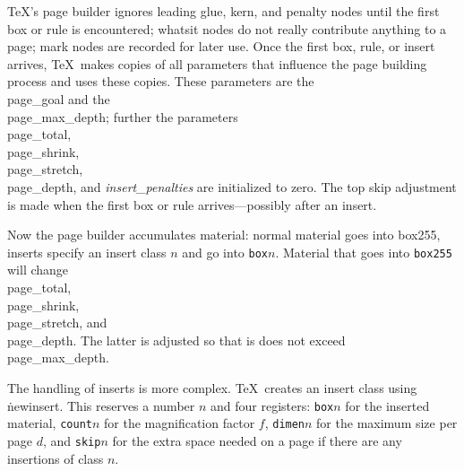 \TeX's page builder ignores leading glue, kern, and penalty nodes until the first
box or rule is encountered;
whatsit nodes do not really contribute anything to a page; mark nodes are recorded for later use.
Once the first box, rule, or insert arrives, \TeX\ makes copies of all parameters
that influence the page building process and uses these copies. These parameters
are the \\{page\_goal} and the \\{page\_max\_depth}; further the parameters
\\{page\_total}, \\{page\_shrink}, \\{page\_stretch}, \\{page\_depth},
and {\it insert\_pe\-nal\-ties\/} are initialized to zero.
The top skip adjustment is made
when the first box or rule arrives---possibly after an insert.

Now the page builder accumulates material: normal material goes into box255,
inserts specify an insert class $n$ and go into {\tt box$n$}.
Material that goes into {\tt box255} will change \\{page\_total}, \\{page\_shrink},
\\{page\_stretch}, and \\{page\_depth}. The latter is adjusted so that
is does not exceed \\{page\_max\_depth}.

The handling of inserts is more complex.
\TeX\ creates an insert class using \.{newinsert}. This reserves a number $n$
and four registers: {\tt box$n$} for the inserted material, {\tt count$n$} for the
magnification factor $f$, {\tt dimen$n$} for the maximum size per page $d$, and {\tt skip$n$} for the
extra space needed on a page if there are any insertions of class $n$.


